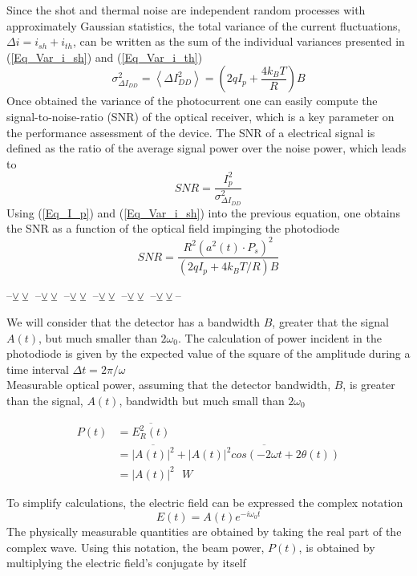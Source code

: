 Since the shot and thermal noise are independent random processes with approximately Gaussian statistics, the total variance of the current fluctuations, $\Delta i= i_{sh}+i_{th}$, can be written as the sum of the individual variances presented in (\ref{Eq_Var_i_sh}) and (\ref{Eq_Var_i_th})
\begin{equation}\label{Eq_Var_i_sh}
    \sigma^2_{\Delta I_{DD}} =  \left<\Delta I_{DD}^2\right> = \left(2qI_p+\frac{4 k_B T}{R}\right) B
\end{equation}
Once obtained the variance of the photocurrent one can easily compute the signal-to-noise-ratio (SNR) of the optical receiver, which is a key parameter on the performance assessment of the device. The SNR of a electrical signal is defined as the ratio of the average signal power over the noise power, which leads to 
\begin{equation}\label{Eq_SNR_Idd}
    SNR=\frac{I_p^2}{\sigma^2_{\Delta I_{DD}}}
\end{equation}
Using (\ref{Eq_I_p}) and (\ref{Eq_Var_i_sh}) into the previous equation, one obtains the SNR as a function of the optical field impinging the photodiode
 \begin{equation}\label{Eq_SNR_Idd}
    SNR=\frac{R^2(a^2(t)\cdot P_s)^2}{\left(2qI_p+ 4 k_B T/R\right) B}
\end{equation}

\newpage

--$\veebar\veebar$
--$\veebar\veebar$
--$\veebar\veebar$
--$\veebar\veebar$
--$\veebar\veebar$
--$\veebar\veebar$--

We will consider that the detector has a bandwidth $B$, greater that the signal $A(t)$, but much smaller than $2 \omega_0$. The calculation of power incident in the photodiode is given by the expected value of the square of the amplitude during a time interval $\Delta t = 2 \pi / \omega$\\

Measurable optical power, assuming that the detector bandwidth, $B$, is greater than the signal, $A(t)$, bandwidth but much small than $2 \omega_0$

\begin{align}
	P(t)	&= \overline{E_R^2(t)}\nonumber\\
			&= \overline{|A(t)|^2} + \overline{ |A(t)|^2 cos\left(-2 \omega t + 2\theta(t)\right)}\nonumber\\
         &= |A(t)|^2 \,\,\,\, W
\end{align}


\vspace{2em}
\noindent
To simplify calculations, the electric field can be expressed the complex notation
%
\begin{equation}
	E(t) = A(t) e^{-i \omega_0 t}
\end{equation}
%
%
The physically measurable quantities are obtained by taking the real part of the complex wave. Using this notation, the beam power, $P(t)$, is obtained by multiplying the electric field's conjugate by itself

